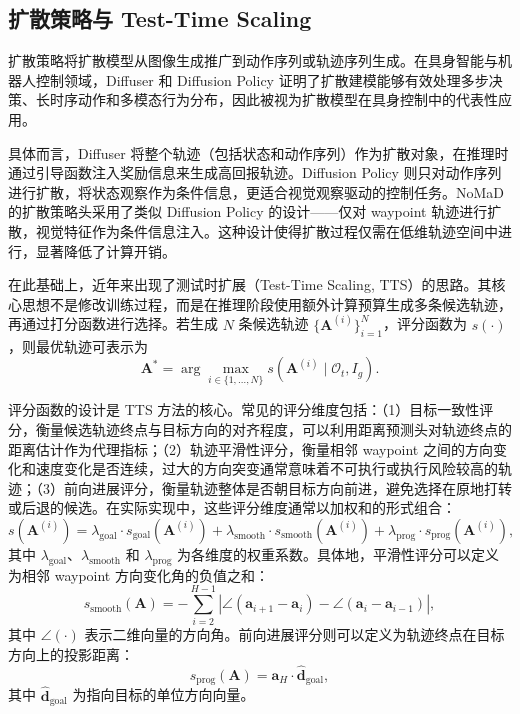 \subsection{扩散策略与 Test-Time Scaling}

扩散策略将扩散模型从图像生成推广到动作序列或轨迹序列生成\cite{diffuser2022,diffusionpolicy2023}。在具身智能与机器人控制领域，Diffuser 和 Diffusion Policy 证明了扩散建模能够有效处理多步决策、长时序动作和多模态行为分布，因此被视为扩散模型在具身控制中的代表性应用。

具体而言，Diffuser\cite{diffuser2022} 将整个轨迹（包括状态和动作序列）作为扩散对象，在推理时通过引导函数注入奖励信息来生成高回报轨迹。Diffusion Policy\cite{diffusionpolicy2023} 则只对动作序列进行扩散，将状态观察作为条件信息，更适合视觉观察驱动的控制任务。NoMaD 的扩散策略头采用了类似 Diffusion Policy 的设计——仅对 waypoint 轨迹进行扩散，视觉特征作为条件信息注入。这种设计使得扩散过程仅需在低维轨迹空间中进行，显著降低了计算开销。

在此基础上，近年来出现了测试时扩展（Test-Time Scaling, TTS）的思路\cite{ttsdiffusion2025,ttssearch2025}。其核心思想不是修改训练过程，而是在推理阶段使用额外计算预算生成多条候选轨迹，再通过打分函数进行选择。若生成 $N$ 条候选轨迹 $\{\mathbf{A}^{(i)}\}_{i=1}^N$，评分函数为 $s(\cdot)$，则最优轨迹可表示为
\begin{equation}
\mathbf{A}^{\ast} = \arg\max_{i\in\{1,\ldots,N\}} s\!\left(\mathbf{A}^{(i)} \mid \mathcal{O}_t, I_g\right).
\end{equation}

评分函数的设计是 TTS 方法的核心。常见的评分维度包括：（1）目标一致性评分，衡量候选轨迹终点与目标方向的对齐程度，可以利用距离预测头对轨迹终点的距离估计作为代理指标；（2）轨迹平滑性评分，衡量相邻 waypoint 之间的方向变化和速度变化是否连续，过大的方向突变通常意味着不可执行或执行风险较高的轨迹；（3）前向进展评分，衡量轨迹整体是否朝目标方向前进，避免选择在原地打转或后退的候选。在实际实现中，这些评分维度通常以加权和的形式组合：
\begin{equation}
s(\mathbf{A}^{(i)}) = \lambda_{\text{goal}} \cdot s_{\text{goal}}(\mathbf{A}^{(i)}) + \lambda_{\text{smooth}} \cdot s_{\text{smooth}}(\mathbf{A}^{(i)}) + \lambda_{\text{prog}} \cdot s_{\text{prog}}(\mathbf{A}^{(i)}),
\end{equation}
其中 $\lambda_{\text{goal}}$、$\lambda_{\text{smooth}}$ 和 $\lambda_{\text{prog}}$ 为各维度的权重系数。具体地，平滑性评分可以定义为相邻 waypoint 方向变化角的负值之和：
\begin{equation}
s_{\text{smooth}}(\mathbf{A}) = -\sum_{i=2}^{H-1} \left|\angle(\mathbf{a}_{i+1} - \mathbf{a}_i) - \angle(\mathbf{a}_i - \mathbf{a}_{i-1})\right|,
\end{equation}
其中 $\angle(\cdot)$ 表示二维向量的方向角。前向进展评分则可以定义为轨迹终点在目标方向上的投影距离：
\begin{equation}
s_{\text{prog}}(\mathbf{A}) = \mathbf{a}_H \cdot \hat{\mathbf{d}}_{\text{goal}},
\end{equation}
其中 $\hat{\mathbf{d}}_{\text{goal}}$ 为指向目标的单位方向向量。

